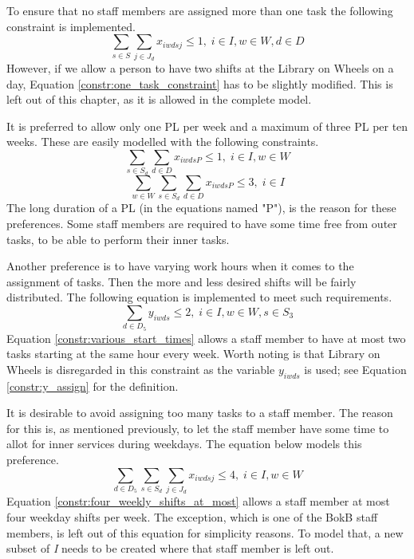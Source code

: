 To ensure that no staff members are assigned more than one task the following constraint is implemented.
\begin{equation} \label{constr:one_task_constraint}
\sum_{s\in S}\sum_{j\in J_d} x_{iwdsj} \leq 1, \;   i\in I, w \in W, d\in D
\end{equation}
However, if we allow a person to have two shifts at the Library on Wheels on a day, Equation \ref{constr:one_task_constraint} has to be slightly modified. This is left out of this chapter, as it is allowed in the complete model.

It is preferred to allow only one PL per week and a maximum of three PL per ten weeks. These are easily modelled with the following constraints.
\begin{equation} \label{constr:one_PL}
\sum_{s \in S_d}\sum_{d \in D} x_{iwdsP} \leq 1, \;   i\in I, w \in W
\end{equation}
\begin{equation} \label{constr:three_PL}
\sum_{w \in W}\sum_{s \in S_d}\sum_{d \in D} x_{iwdsP} \leq 3, \;   i\in I
\end{equation}
The long duration of a PL (in the equations named "P"), is the reason for these preferences. Some staff members are required to have some time free from outer tasks, to be able to perform their inner tasks.

Another preference is to have varying work hours when it comes to the assignment of tasks. Then the more and less desired shifts will be fairly distributed. The following equation is implemented to meet such requirements.
\begin{equation} \label{constr:various_start_times}
\sum_{d \in D_5} y_{iwds} \leq 2, \;   i\in I, w \in W, s \in S_3
\end{equation}
Equation \ref{constr:various_start_times} allows a staff member to have at most two tasks starting at the same hour every week. Worth noting is that Library on Wheels is disregarded in this constraint as the variable $y_{iwds}$ is used; see Equation \ref{constr:y_assign} for the definition.

It is desirable to avoid assigning too many tasks to a staff member. The reason for this is, as mentioned previously, to let the staff member have some time to allot for inner services during weekdays. The equation below models this preference.
\begin{equation} \label{constr:four_weekly_shifts_at_most}
\sum_{d \in D_5}\sum_{s \in S_d}\sum_{j \in J_d} x_{iwdsj} \leq 4, \;   i\in I, w \in W
\end{equation}
Equation \ref{constr:four_weekly_shifts_at_most} allows a staff member at most four weekday shifts per week. The exception, which is one of the BokB staff members, is left out of this equation for simplicity reasons. To model that, a new subset of \textit{I} needs to be created where that staff member is left out. 

